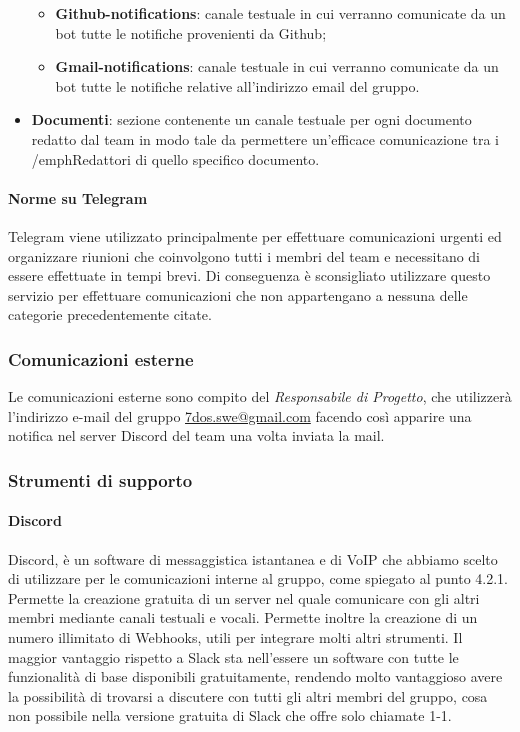 \begin{itemize}
{		\begin{itemize}
			\item{\textbf{Github-notifications}: canale testuale in cui verranno comunicate da un bot tutte le notifiche provenienti da Github;}
			\item{\textbf{Gmail-notifications}: canale testuale in cui verranno comunicate da un bot tutte le notifiche relative all'indirizzo email del gruppo.}			
		\end{itemize}
	}
	\item{\textbf{Documenti}: sezione contenente un canale testuale per ogni documento redatto dal team in modo tale da permettere un'efficace comunicazione tra i /emph{Redattori} di quello specifico documento.}
 \end{itemize}
\paragraph{Norme su Telegram}\Spazio
 Telegram viene utilizzato principalmente per effettuare comunicazioni urgenti ed organizzare riunioni che coinvolgono tutti i membri del team e necessitano di essere effettuate in tempi brevi. Di conseguenza è sconsigliato utilizzare questo servizio per effettuare comunicazioni che non appartengano a nessuna delle categorie precedentemente citate.

\subsubsection{Comunicazioni esterne}
Le comunicazioni esterne sono compito del \emph{Responsabile di Progetto}, che utilizzerà l'indirizzo e-mail del gruppo \href{mailto:7dos.swe@gmail.com}{7dos.swe@gmail.com} facendo così apparire una notifica nel server Discord del team una volta inviata la mail.
\subsubsection{Strumenti di supporto}
\paragraph{Discord}\Spazio
Discord, è un software di messaggistica istantanea e di VoIP che abbiamo scelto di utilizzare per le comunicazioni interne al gruppo, come spiegato al punto 4.2.1. Permette la creazione gratuita di un server nel quale comunicare con gli altri membri mediante canali testuali e vocali. Permette inoltre la creazione di un numero illimitato di Webhooks, utili per integrare molti altri strumenti.
Il maggior vantaggio rispetto a Slack sta nell'essere un software con tutte le funzionalità di base disponibili gratuitamente, rendendo molto vantaggioso avere la possibilità di trovarsi a discutere con tutti gli altri membri del gruppo, cosa non possibile nella versione gratuita di Slack che offre solo chiamate 1-1.
